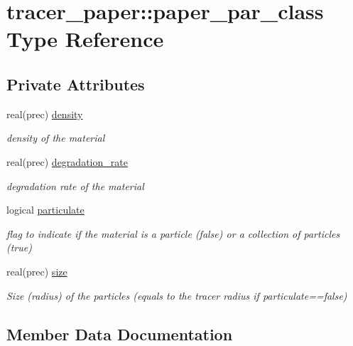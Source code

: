 \hypertarget{structtracer__paper_1_1paper__par__class}{}\section{tracer\+\_\+paper\+:\+:paper\+\_\+par\+\_\+class Type Reference}
\label{structtracer__paper_1_1paper__par__class}
\subsection*{Private Attributes}
\begin{DoxyCompactItemize}
\item 
real(prec) \mbox{\hyperlink{structtracer__paper_1_1paper__par__class_a6d5b6834f7eae793f44202e07f4357df}{density}}
\begin{DoxyCompactList}\small\item\em density of the material \end{DoxyCompactList}\item 
real(prec) \mbox{\hyperlink{structtracer__paper_1_1paper__par__class_a123352996efb1f5edbc9bffdb1460554}{degradation\+\_\+rate}}
\begin{DoxyCompactList}\small\item\em degradation rate of the material \end{DoxyCompactList}\item 
logical \mbox{\hyperlink{structtracer__paper_1_1paper__par__class_aeab5446446cfc5d4cb33952a9fbb3c57}{particulate}}
\begin{DoxyCompactList}\small\item\em flag to indicate if the material is a particle (false) or a collection of particles (true) \end{DoxyCompactList}\item 
real(prec) \mbox{\hyperlink{structtracer__paper_1_1paper__par__class_a6e14c2ad93dba6e524d9eb1665af56e8}{size}}
\begin{DoxyCompactList}\small\item\em Size (radius) of the particles (equals to the tracer radius if particulate==false) \end{DoxyCompactList}\end{DoxyCompactItemize}


\subsection{Member Data Documentation}
\mbox{\label{structtracer__paper_1_1paper__par__class_a123352996efb1f5edbc9bffdb1460554}} 
